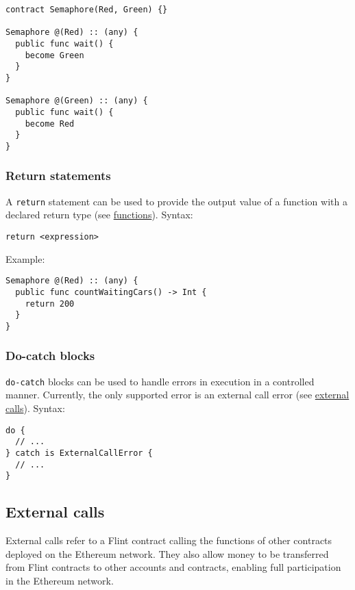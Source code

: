 \begin{verbatim}
contract Semaphore(Red, Green) {}

Semaphore @(Red) :: (any) {
  public func wait() {
    become Green
  }
}

Semaphore @(Green) :: (any) {
  public func wait() {
    become Red
  }
}
\end{verbatim}

\subsubsection{Return statements}
\label{sec:appendix-b-return-statements}

A \texttt{return} statement can be used to provide the output value of a function with a declared return type (see \hyperref[sec:appendix-b-functions]{functions}). Syntax:

\begin{verbatim}
return <expression>
\end{verbatim}

Example:

\begin{verbatim}
Semaphore @(Red) :: (any) {
  public func countWaitingCars() -> Int {
    return 200
  }
}
\end{verbatim}

\subsubsection{Do-catch blocks}
\label{sec:appendix-b-do-catch-blocks}

\texttt{do-catch} blocks can be used to handle errors in execution in a controlled manner. Currently, the only supported error is an external call error (see \hyperref[sec:appendix-b-external-calls]{external calls}). Syntax:

\begin{verbatim}
do {
  // ...
} catch is ExternalCallError {
  // ...
}
\end{verbatim}

\subsection{External calls}
\label{sec:appendix-b-external-calls}

External calls refer to a Flint contract calling the functions of other contracts deployed on the Ethereum network. They also allow money to be transferred from Flint contracts to other accounts and contracts, enabling full participation in the Ethereum network.

